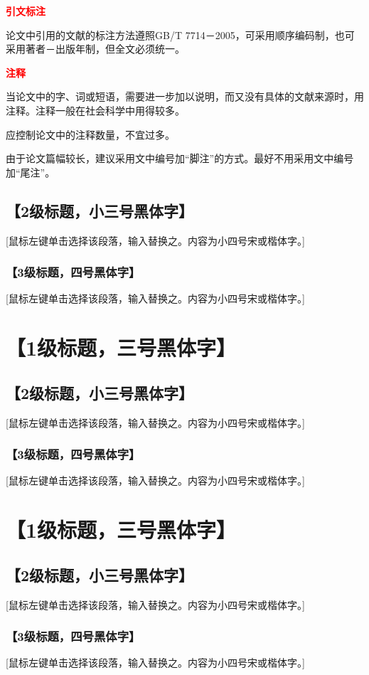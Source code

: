 \documentclass{bjtu-bachelor-thesis}
\begin{document}
\textcolor{red}{\textbf{引文标注}}\par
论文中引用的文献的标注方法遵照GB/T 7714－2005，可采用顺序编码制，也可采用著者－出版年制，但全文必须统一。\par
\textcolor{red}{\textbf{注释}}\par
当论文中的字、词或短语，需要进一步加以说明，而又没有具体的文献来源时，用注释。注释一般在社会科学中用得较多。\par
应控制论文中的注释数量，不宜过多。\par
由于论文篇幅较长，建议采用文中编号加“脚注”的方式。最好不用采用文中编号加“尾注”。\par

\section{【2级标题，小三号黑体字】 }
 [鼠标左键单击选择该段落，输入替换之。内容为小四号宋或楷体字。]
\subsection{【3级标题，四号黑体字】 }
[鼠标左键单击选择该段落，输入替换之。内容为小四号宋或楷体字。]

\chapter{【1级标题，三号黑体字】}
\section{【2级标题，小三号黑体字】 }
 [鼠标左键单击选择该段落，输入替换之。内容为小四号宋或楷体字。]
\subsection{【3级标题，四号黑体字】 }
[鼠标左键单击选择该段落，输入替换之。内容为小四号宋或楷体字。]

\chapter{【1级标题，三号黑体字】}
\section{【2级标题，小三号黑体字】 }
 [鼠标左键单击选择该段落，输入替换之。内容为小四号宋或楷体字。]
\subsection{【3级标题，四号黑体字】 }
[鼠标左键单击选择该段落，输入替换之。内容为小四号宋或楷体字。]
\end{document}
